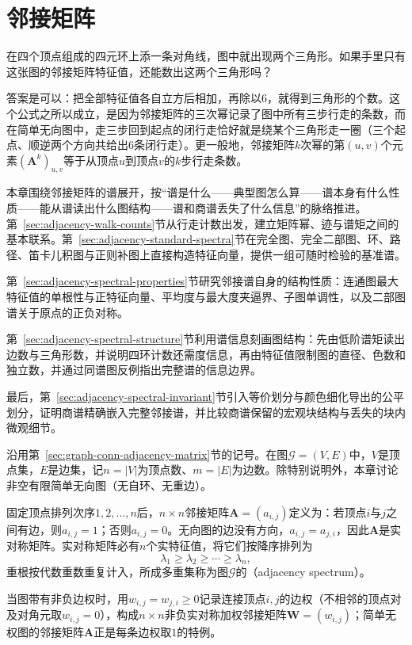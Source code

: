 \chapter{邻接矩阵}
\label{chap:graph-adjacency-matrix}

在四个顶点组成的四元环上添一条对角线，图中就出现两个三角形。如果手里只有这张图的邻接矩阵特征值，还能数出这两个三角形吗？

答案是可以：把全部特征值各自立方后相加，再除以$6$，就得到三角形的个数。这个公式之所以成立，是因为邻接矩阵的三次幂记录了图中所有三步行走的条数，而在简单无向图中，走三步回到起点的闭行走恰好就是绕某个三角形走一圈（三个起点、顺逆两个方向共给出$6$条闭行走）。更一般地，邻接矩阵$k$次幂的第$(u,v)$个元素$(\bm A^k)_{u,v}$等于从顶点$u$到顶点$v$的$k$步行走条数。

本章围绕邻接矩阵的谱展开，按“谱是什么——典型图怎么算——谱本身有什么性质——能从谱读出什么图结构——谱和商谱丢失了什么信息”的脉络推进。第~\ref{sec:adjacency-walk-counts}节从行走计数出发，建立矩阵幂、迹与谱矩之间的基本联系。第~\ref{sec:adjacency-standard-spectra}节在完全图、完全二部图、环、路径、笛卡儿积图与正则补图上直接构造特征向量，提供一组可随时检验的基准谱。

第~\ref{sec:adjacency-spectral-properties}节研究邻接谱自身的结构性质：连通图最大特征值的单根性与正特征向量、平均度与最大度夹逼界、子图单调性，以及二部图谱关于原点的正负对称。

第~\ref{sec:adjacency-spectral-structure}节利用谱信息刻画图结构：先由低阶谱矩读出边数与三角形数，并说明四环计数还需度信息，再由特征值限制图的直径、色数和独立数，并通过同谱图反例指出完整谱的信息边界。

最后，第~\ref{sec:adjacency-spectral-invariant}节引入等价划分与颜色细化导出的公平划分，证明商谱精确嵌入完整邻接谱，并比较商谱保留的宏观块结构与丢失的块内微观细节。

沿用第~\ref{sec:graph-conn-adjacency-matrix}节的记号。在图$\mathcal G=(V,E)$中，$V$是顶点集，$E$是边集，记$n=|V|$为顶点数、$m=|E|$为边数。除特别说明外，本章讨论非空有限简单无向图（无自环、无重边）。

固定顶点排列次序$1,2,\ldots,n$后，$n\times n$邻接矩阵$\bm A=(a_{i,j})$定义为：若顶点$i$与$j$之间有边，则$a_{i,j}=1$；否则$a_{i,j}=0$。无向图的边没有方向，$a_{i,j}=a_{j,i}$，因此$\bm A$是实对称矩阵。实对称矩阵必有$n$个实特征值，将它们按降序排列为
\[
\lambda_1\geq\lambda_2\geq\cdots\geq\lambda_n,
\]
重根按代数重数重复计入，所成多重集称为图$\mathcal G$的（adjacency spectrum）。

当图带有非负边权时，用$w_{i,j}=w_{j,i}\geq 0$记录连接顶点$i,j$的边权（不相邻的顶点对及对角元取$w_{i,j}=0$），构成$n\times n$非负实对称加权邻接矩阵$\bm W=(w_{i,j})$；简单无权图的邻接矩阵$\bm A$正是每条边权取$1$的特例。







